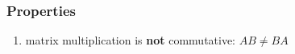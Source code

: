 \subsubsection{Properties}

\begin{enumerate}[itemsep=0.2cm]
    \item matrix multiplication is \textbf{not} commutative: $AB \neq BA$
    \hfill \cite{mfml/book/mml/Deisenroth-Faisal-Ong}

    

\end{enumerate}















